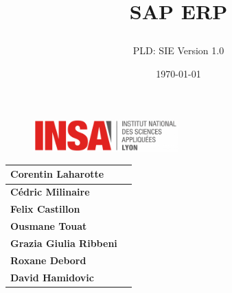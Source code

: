 \documentclass[]{scrartcl}
\title{SAP ERP
\subtitle{}
\author{PLD: SIE
Version 1.0}
\date{\today}}
\begin{document}
\maketitle

\begin{figure}[h]
	\centering
  \includegraphics[width=0.5\textwidth]{img/insa-logo}
	\label{fig:logo}
\end{figure}


\begin{center}
  \begin{tabular}{ | l | r | }
    \hline
    \textbf{Corentin Laharotte}\\ \hline
    \textbf{Cédric Milinaire }\\ \hline
    \textbf{Felix Castillon}\\ \hline
    \textbf{Ousmane Touat}\\ \hline
	\textbf{Grazia Giulia Ribbeni }\\ \hline
	\textbf{Roxane Debord} \\ \hline 
	    \textbf{David Hamidovic}\\ \hline
  \end{tabular}
\end{center}

\thispagestyle{empty}
\pagebreak
\vspace*{10pt}
\tableofcontents
\listoffigures
\newpage
\end{document}
